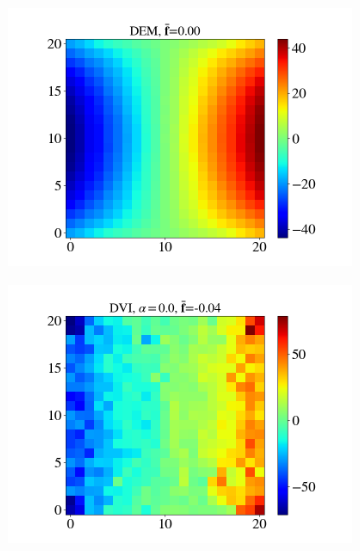 \begin{itemize}
	\begin{figure}[H]
		\centering	
		\begin{subfigure}{0.32\columnwidth}	
			\centering
			\includegraphics[width=1.0\textwidth]{images/CD/Example7/20/T2_21_DEM_0.png}
		\end{subfigure}
		\begin{subfigure}{0.32\columnwidth}	
			\centering
			\includegraphics[width=1.0\textwidth]{images/CD/Example7/20/T2_21_DVI_0.0.png}
		\end{subfigure}
		\begin{subfigure}{0.32\columnwidth}	
			\centering

\end{subfigure}
\end{figure}
\end{itemize}
